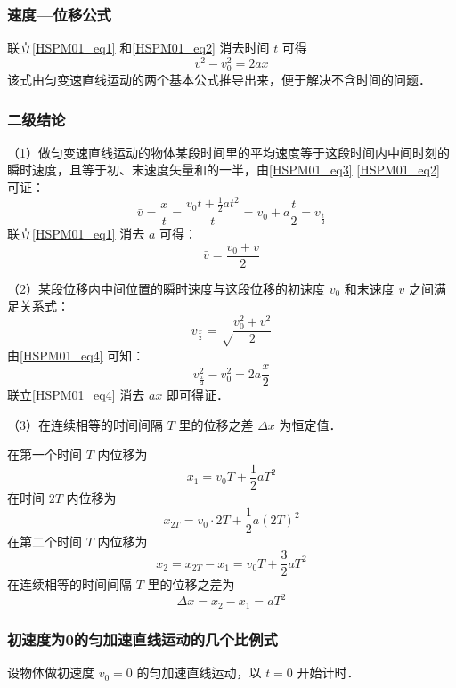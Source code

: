 \subsubsection{速度—位移公式}
联立\autoref{HSPM01_eq1} 和\autoref{HSPM01_eq2} 消去时间 $t$ 可得
\begin{equation}\label{HSPM01_eq4}
v^2-v_0^2=2ax
\end{equation}
该式由匀变速直线运动的两个基本公式推导出来，便于解决不含时间的问题．

\subsubsection{二级结论}
（1）做匀变速直线运动的物体某段时间里的平均速度等于这段时间内中间时刻的瞬时速度，且等于初、末速度矢量和的一半，由\autoref{HSPM01_eq3} \autoref{HSPM01_eq2} 可证：
\begin{equation}
\bar v=\frac xt=\frac{v_0t+\frac 12at^2}{t}=v_0+a\frac t2=v_{\frac t2}
\end{equation}
联立\autoref{HSPM01_eq1} 消去 $a$ 可得：
\begin{equation}
\bar v=\frac{v_0+v}{2}
\end{equation}

（2）某段位移内中间位置的瞬时速度与这段位移的初速度 $v_0$ 和末速度 $v$ 之间满足关系式：
\begin{equation}
v_\frac x2=\sqrt \frac{v_0^2+v^2}2
\end{equation}
由\autoref{HSPM01_eq4} 可知：
\begin{equation}
v_{\frac x2}^2-v_0^2=2a\frac x2
\end{equation}
联立\autoref{HSPM01_eq4} 消去 $ax$ 即可得证．

（3）在连续相等的时间间隔 $T$ 里的位移之差 $\Delta x$ 为恒定值．

在第一个时间 $T$ 内位移为
\begin{equation}
x_1=v_0T+\frac12aT^2
\end{equation}
在时间 $2T$ 内位移为
\begin{equation}
x_{2T}=v_0\cdot2T+\frac12a(2T)^2
\end{equation}
在第二个时间 $T$ 内位移为
\begin{equation}
x_2=x_{2T}-x_1=v_0T+\frac32aT^2
\end{equation}
在连续相等的时间间隔 $T$ 里的位移之差为
\begin{equation}
\Delta x=x_2-x_1=aT^2
\end{equation}

\subsubsection{初速度为0的匀加速直线运动的几个比例式}
设物体做初速度 $v_0=0$ 的匀加速直线运动，以 $t=0$ 开始计时．

